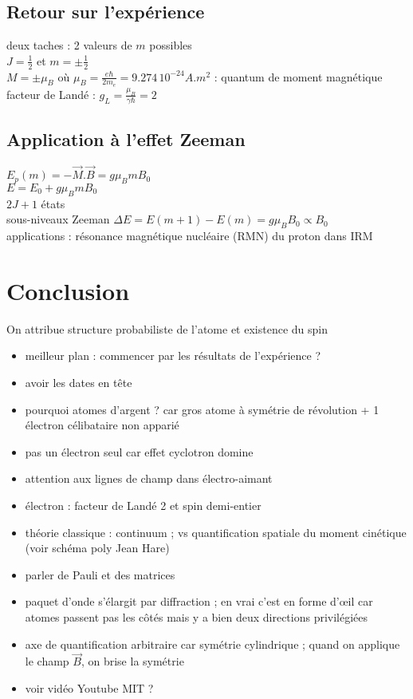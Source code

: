 \subsection{Retour sur l'expérience}
deux taches : 2 valeurs de $m$ possibles \\
$J=\frac{1}{2}$ et $m=\pm \frac{1}{2}$ \\
$M=\pm\mu_B$ où $\mu_B=\frac{e \hbar}{2 m_e}=9.274 \, 10^{-24} A.m^2 $ : quantum de moment magnétique \\
facteur de Landé : $g_L=\frac{\mu_B}{\gamma \hbar}=2$ \\

\subsection{Application à l'effet Zeeman}
$E_p (m)=-\vec{M} . \vec{B}=g\mu_B m B_0 $ \\
$E=E_0+ g \mu_B m B_0$ \\
$2J+1$ états \\
sous-niveaux Zeeman $\Delta E = E(m+1) - E(m)= g \mu_B B_0 \propto B_0$\\
applications : résonance magnétique nucléaire (RMN) du proton dans IRM \\

\section*{Conclusion}
On attribue structure probabiliste de l'atome et existence du spin \\


\begin{remarques} \begin{itemize} 
\item meilleur plan : commencer par les résultats de l'expérience ?
\item avoir les dates en tête
\item pourquoi atomes d'argent ? car gros atome à symétrie de révolution + 1 électron célibataire non apparié
\item pas un électron seul car effet cyclotron domine 
\item attention aux lignes de champ dans électro-aimant
\item électron : facteur de Landé 2 et spin demi-entier 
\item théorie classique : continuum ; vs quantification spatiale du moment cinétique (voir schéma poly Jean Hare)
\item parler de Pauli et des matrices
\item paquet d'onde s'élargit par diffraction ; en vrai c'est en forme d'œil car atomes passent pas les côtés mais y a bien deux directions privilégiées
\item axe de quantification arbitraire car symétrie cylindrique ; quand on applique le champ $\vec{B}$, on brise la symétrie
\item voir vidéo Youtube MIT ? 
\end{itemize} \end{remarques}